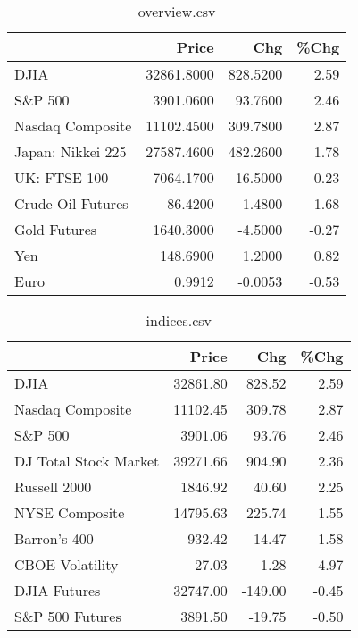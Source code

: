 \documentclass{article}%
\begin{document}
\begin{table}[htbp]%
\caption{overview.csv}%
\centering%
\begin{adjustbox}{width=1\textwidth}%
\begin{tabular}{lrrr}
\toprule
                  &      Price &      Chg &  \%Chg \\
\midrule
             DJIA & 32861.8000 & 828.5200 &  2.59 \\
          S\&P 500 &  3901.0600 &  93.7600 &  2.46 \\
 Nasdaq Composite & 11102.4500 & 309.7800 &  2.87 \\
Japan: Nikkei 225 & 27587.4600 & 482.2600 &  1.78 \\
     UK: FTSE 100 &  7064.1700 &  16.5000 &  0.23 \\
Crude Oil Futures &    86.4200 &  -1.4800 & -1.68 \\
     Gold Futures &  1640.3000 &  -4.5000 & -0.27 \\
              Yen &   148.6900 &   1.2000 &  0.82 \\
             Euro &     0.9912 &  -0.0053 & -0.53 \\
\bottomrule
\end{tabular}
%
\end{adjustbox}%
\end{table}

%


\begin{table}[htbp]%
\caption{indices.csv}%
\centering%
\begin{adjustbox}{width=1\textwidth}%
\begin{tabular}{lrrr}
\toprule
                      &    Price &     Chg &  \%Chg \\
\midrule
                 DJIA & 32861.80 &  828.52 &  2.59 \\
     Nasdaq Composite & 11102.45 &  309.78 &  2.87 \\
              S\&P 500 &  3901.06 &   93.76 &  2.46 \\
DJ Total Stock Market & 39271.66 &  904.90 &  2.36 \\
         Russell 2000 &  1846.92 &   40.60 &  2.25 \\
       NYSE Composite & 14795.63 &  225.74 &  1.55 \\
         Barron's 400 &   932.42 &   14.47 &  1.58 \\
      CBOE Volatility &    27.03 &    1.28 &  4.97 \\
         DJIA Futures & 32747.00 & -149.00 & -0.45 \\
      S\&P 500 Futures &  3891.50 &  -19.75 & -0.50 \\
\bottomrule
\end{tabular}
%
\end{adjustbox}%
\end{table}
\end{document}
